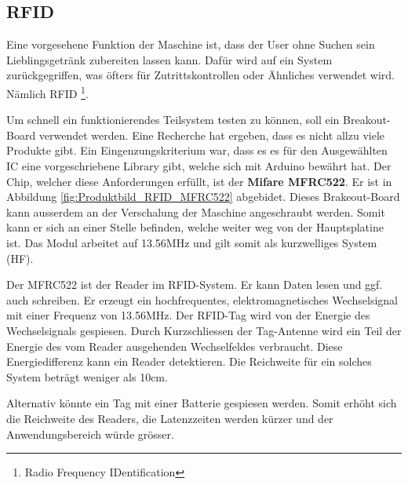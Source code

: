 \subsection{RFID}
\label{subsec:RFID}

Eine vorgesehene Funktion der Maschine ist, dass der User ohne Suchen sein Lieblingsgetränk zubereiten lassen kann. Dafür wird auf ein System zurückgegriffen, was öfters für Zutrittskontrollen oder Ähnliches verwendet wird. Nämlich RFID \footnote{Radio Frequency IDentification}.

Um schnell ein funktionierendes Teilsystem testen zu können, soll ein Breakout-Board verwendet werden. Eine Recherche hat ergeben, dass es nicht allzu viele Produkte gibt. Ein Eingenzungskriterium war, dass es es für den Ausgewählten IC eine vorgeschriebene Library gibt, welche sich mit Arduino bewährt hat. Der Chip, welcher diese Anforderungen erfüllt, ist der \textbf{Mifare MFRC522}. Er ist in Abbildung \ref{fig:Produktbild_RFID_MFRC522} abgebidet. Dieses Brakeout-Board kann ausserdem an der Verschalung der Maschine angeschraubt werden. Somit kann er sich an einer Stelle befinden, welche weiter weg von der Hauptsplatine ist.
Das Modul arbeitet auf 13.56MHz und gilt somit als kurzwelliges System (HF).

Der MFRC522 ist der Reader im RFID-System. Er kann Daten lesen und ggf. auch schreiben. Er erzeugt ein hochfrequentes, elektromagnetisches Wechselsignal mit einer Frequenz von 13.56MHz. Der RFID-Tag wird von der Energie des Wechselsignals gespiesen. Durch Kurzschliessen der Tag-Antenne wird ein Teil der Energie des vom Reader ausgehenden Wechselfeldes verbraucht. Diese Energiedifferenz kann ein Reader detektieren. Die Reichweite für ein solches System beträgt weniger als 10cm.

Alternativ könnte ein Tag mit einer Batterie gespiesen werden. Somit erhöht sich die Reichweite des Readers, die Latenzzeiten werden kürzer und der Anwendungsbereich würde grösser.


